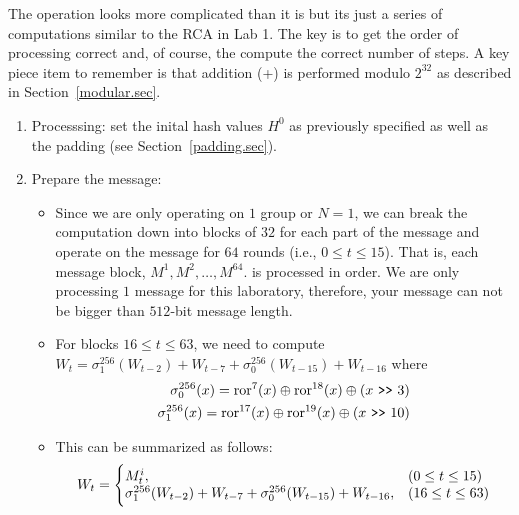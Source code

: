\documentclass{article}
\begin{document}
The operation looks more complicated than it is but its just a series
of computations similar to the RCA in Lab 1.  The key is to get the order of
processing correct and, of course, the compute the correct number of steps.
A key piece item to remember is that
addition (+) is performed modulo $2^{32}$ as described in Section~\ref{modular.sec}.
\begin{enumerate}
  \item Processsing: set the inital hash values $H^0$ as previously
    specified as well as the padding (see Section~\ref{padding.sec}).
  \item Prepare the message:
    \begin{itemize}
  \item Since we are only operating on $1$ group or $N=1$, we can
    break the computation down into blocks of $32$ for each part
    of the message and operate on the message for $64$ rounds (i.e.,
    $0 \leq t \leq 15$).
    That is, each message block, $M^1, M^2, \ldots, M^{64}$. 
    is processed in order.  We are only processing $1$ message for
    this laboratory, therefore, your message can not be bigger than
    $512$-bit message length.  
  \item For blocks $16 \leq t \leq 63$, we need to compute
    $W_t = \sigma_1^{256} (W_{t-2}) + W_{t-7} + \sigma_0^{256} (W_{t-15}) + W_{t-16}$
    where
    \begin{eqnarray*}
      \sigma_0^{256}(x) = \text{ror}^{7}(x) \oplus \text{ror}^{18}(x) \oplus (x~\verb!>>!~3)    \\
      \sigma_1^{256}(x) = \text{ror}^{17}(x) \oplus \text{ror}^{19}(x) \oplus (x~\verb!>>!~10)    
    \end{eqnarray*}
  \item This can be summarized as follows:
    \begin{eqnarray*}
      W_t = \Biggl\{
      \begin{array}{@{}ll@{}}
        M_t^i,      & (0 \leq t \leq 15)  \\
        \sigma_1^{256} (W_{t-2}) + W_{t-7} + \sigma_0^{256} (W_{t-15}) +  W_{t-16},  & (16 \leq t \leq 63) 
      \end{array}
    \end{eqnarray*}  
    
    \end{itemize}
    

\end{enumerate}
\end{document}
